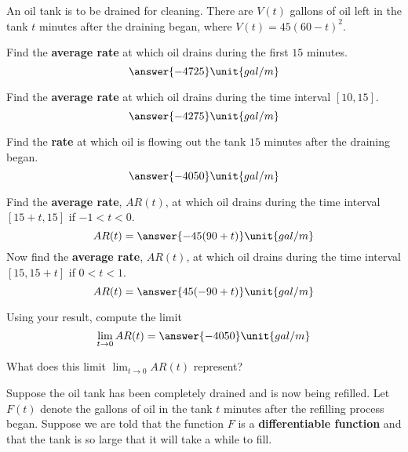\documentclass{ximera}
\begin{document}
An oil tank is to be drained for cleaning. There are $V(t)$ gallons of oil left in the tank $t$ minutes after the draining began, where $V(t)=45(60-t)^2$.
\begin{exercise}
Find the \textbf{average rate} at which oil drains during the first $15$ minutes. 
\[
\answer{-4725}\unit{gal/m}
\]
\begin{exercise}
Find the \textbf{average rate} at which oil drains during the time interval $[10,15]$. 
\[
\answer{-4275}\unit{gal/m}
\]
\begin{exercise}
Find the \textbf{rate} at which oil is flowing out the tank $15$ minutes after the draining began.
\[
\answer{-4050}\unit{gal/m}
\]
\begin{exercise}
Find the \textbf{average rate}, $AR(t)$, at which oil drains during the time interval $[15+ t,15]$ if $-1< t<0$. 
\[
AR( t)=\answer{-45(90+ t)}\unit{gal/m}
\]
Now find the \textbf{average rate}, $AR( t)$, at which oil drains during the time interval $[15,15+ t]$ if $0< t<1$. 
\[
AR( t)=\answer{45(-90+ t)}\unit{gal/m}
\]
\begin{exercise}
Using your result, compute the limit
\[
\lim_{ t\to 0}AR( t)=\answer{-4050}\unit{gal/m}
\]
\begin{exercise}
What does this limit $\lim_{t\to 0}AR( t)$ represent?
\begin{multipleChoice}
\end{multipleChoice}
\begin{exercise}
Suppose the oil tank has been completely drained and is now being refilled. Let $F(t)$ denote the gallons of oil in the tank $t$ minutes after the refilling process began. Suppose we are told that the function $F$ is a \textbf{differentiable function} and that the tank is so large that it will take a while to fill. 


\end{exercise}
\end{exercise}
\end{exercise}
\end{exercise}
\end{exercise}
\end{exercise}
\end{exercise}
\end{document}
